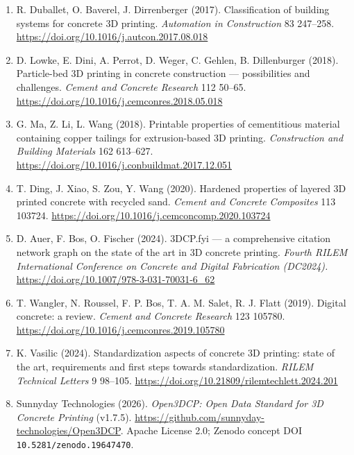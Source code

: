 \documentclass[
  11pt,
  letterpaper,
]{article}
\begin{document}
\begin{enumerate}
  C. Gosselin, R. Duballet, P. Roux, N. Gaudillière, J. Dirrenberger, P.
  Morel (2016). Large-scale 3D printing of ultra-high performance
  concrete --- a new processing route for architects and builders.
  \emph{Materials \& Design} 100 102--109.
  \url{https://doi.org/10.1016/j.matdes.2016.03.097}
\item
  R. Duballet, O. Baverel, J. Dirrenberger (2017). Classification of
  building systems for concrete 3D printing. \emph{Automation in
  Construction} 83 247--258.
  \url{https://doi.org/10.1016/j.autcon.2017.08.018}
\item
  D. Lowke, E. Dini, A. Perrot, D. Weger, C. Gehlen, B. Dillenburger
  (2018). Particle-bed 3D printing in concrete construction ---
  possibilities and challenges. \emph{Cement and Concrete Research} 112
  50--65. \url{https://doi.org/10.1016/j.cemconres.2018.05.018}
\item
  G. Ma, Z. Li, L. Wang (2018). Printable properties of cementitious
  material containing copper tailings for extrusion-based 3D printing.
  \emph{Construction and Building Materials} 162 613--627.
  \url{https://doi.org/10.1016/j.conbuildmat.2017.12.051}
\item
  T. Ding, J. Xiao, S. Zou, Y. Wang (2020). Hardened properties of
  layered 3D printed concrete with recycled sand. \emph{Cement and
  Concrete Composites} 113 103724.
  \url{https://doi.org/10.1016/j.cemconcomp.2020.103724}
\item
  D. Auer, F. Bos, O. Fischer (2024). 3DCP.fyi --- a comprehensive
  citation network graph on the state of the art in 3D concrete
  printing. \emph{Fourth RILEM International Conference on Concrete and
  Digital Fabrication (DC2024).}
  \url{https://doi.org/10.1007/978-3-031-70031-6_62}
\item
  T. Wangler, N. Roussel, F. P. Bos, T. A. M. Salet, R. J. Flatt (2019).
  Digital concrete: a review. \emph{Cement and Concrete Research} 123
  105780. \url{https://doi.org/10.1016/j.cemconres.2019.105780}
\item
  K. Vasilic (2024). Standardization aspects of concrete 3D printing:
  state of the art, requirements and first steps towards
  standardization. \emph{RILEM Technical Letters} 9 98--105.
  \url{https://doi.org/10.21809/rilemtechlett.2024.201}
\item
  Sunnyday Technologies (2026). \emph{Open3DCP: Open Data Standard for
  3D Concrete Printing} (v1.7.5).
  \url{https://github.com/sunnyday-technologies/Open3DCP}. Apache
  License 2.0; Zenodo concept DOI \texttt{10.5281/zenodo.19647470}.

\end{enumerate}
\end{document}

